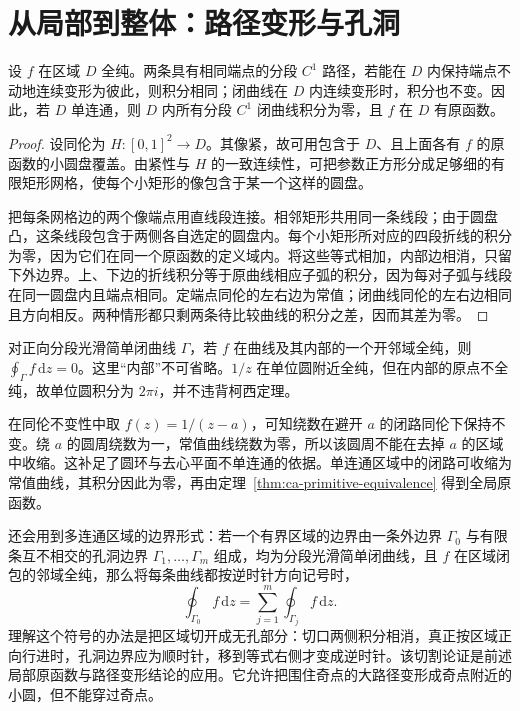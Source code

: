 \section{从局部到整体：路径变形与孔洞}

\begin{theorem}[同伦不变性与单连通形式]
\label{thm:ca-cauchy-domain}
设 $f$ 在区域 $D$ 全纯。两条具有相同端点的分段 $C^1$ 路径，若能在 $D$ 内保持端点不动地连续变形为彼此，则积分相同；闭曲线在 $D$ 内连续变形时，积分也不变。因此，若 $D$ 单连通，则 $D$ 内所有分段 $C^1$ 闭曲线积分为零，且 $f$ 在 $D$ 有原函数。
\end{theorem}
\begin{proof}
设同伦为 $H:[0,1]^2\to D$。其像紧，故可用包含于 $D$、且上面各有 $f$ 的原函数的小圆盘覆盖。由紧性与 $H$ 的一致连续性，可把参数正方形分成足够细的有限矩形网格，使每个小矩形的像包含于某一个这样的圆盘。

把每条网格边的两个像端点用直线段连接。相邻矩形共用同一条线段；由于圆盘凸，这条线段包含于两侧各自选定的圆盘内。每个小矩形所对应的四段折线的积分为零，因为它们在同一个原函数的定义域内。将这些等式相加，内部边相消，只留下外边界。上、下边的折线积分等于原曲线相应子弧的积分，因为每对子弧与线段在同一圆盘内且端点相同。定端点同伦的左右边为常值；闭曲线同伦的左右边相同且方向相反。两种情形都只剩两条待比较曲线的积分之差，因而其差为零。
\end{proof}

对正向分段光滑简单闭曲线 $\Gamma$，若 $f$ 在曲线及其内部的一个开邻域全纯，则 $\oint_\Gamma f\,\mathrm dz=0$。这里“内部”不可省略。$1/z$ 在单位圆附近全纯，但在内部的原点不全纯，故单位圆积分为 $2\pi i$，并不违背柯西定理。

在同伦不变性中取 $f(z)=1/(z-a)$，可知绕数在避开 $a$ 的闭路同伦下保持不变。绕 $a$ 的圆周绕数为一，常值曲线绕数为零，所以该圆周不能在去掉 $a$ 的区域中收缩。这补足了圆环与去心平面不单连通的依据。单连通区域中的闭路可收缩为常值曲线，其积分因此为零，再由定理~\ref{thm:ca-primitive-equivalence} 得到全局原函数。

还会用到多连通区域的边界形式：若一个有界区域的边界由一条外边界 $\Gamma_0$ 与有限条互不相交的孔洞边界 $\Gamma_1,\ldots,\Gamma_m$ 组成，均为分段光滑简单闭曲线，且 $f$ 在区域闭包的邻域全纯，那么将每条曲线都按逆时针方向记号时，
\begin{equation}
 \oint_{\Gamma_0}f\,\mathrm dz
 =\sum_{j=1}^m\oint_{\Gamma_j}f\,\mathrm dz.
 \label{eq:ca-boundary-deformation}
\end{equation}
理解这个符号的办法是把区域切开成无孔部分：切口两侧积分相消，真正按区域正向行进时，孔洞边界应为顺时针，移到等式右侧才变成逆时针。该切割论证是前述局部原函数与路径变形结论的应用。它允许把围住奇点的大路径变形成奇点附近的小圆，但不能穿过奇点。

